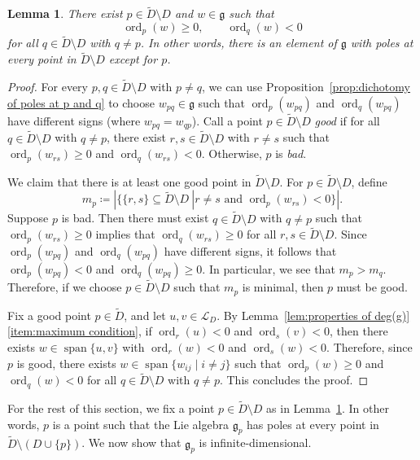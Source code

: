 \documentclass[12pt]{amsart}
\theoremstyle{plain}
\newtheorem{lemma}[theorem]{Lemma}
\theoremstyle{definition}
\numberwithin{equation}{section}
\def\g{\mathfrak{g}}
\def\L{\mathcal{L}}
\DeclareMathOperator{\spn}{span}
\DeclareMathOperator{\ord}{ord}
\begin{document}
\begin{lemma}\label{lem:good point}
    There exist $p \in \widetilde{D} \setminus D$ and $w \in \g$ such that
    $$\ord_p(w) \geq 0, \qquad \ord_q(w) < 0$$
    for all $q \in \widetilde{D} \setminus D$ with $q \neq p$. In other words, there is an element of $\g$ with poles at every point in $\widetilde{D} \setminus D$ except for $p$.
\end{lemma}
\begin{proof}
    For every $p,q \in \widetilde{D} \setminus D$ with $p \neq q$, we can use Proposition~\ref{prop:dichotomy of poles at p and q} to choose $w_{pq} \in \g$ such that $\ord_{p}(w_{pq})$ and $\ord_{q}(w_{pq})$ have different signs (where $w_{pq} = w_{qp}$). Call a point $p \in \widetilde{D} \setminus D$ \emph{good} if for all $q \in \widetilde{D} \setminus D$ with $q \neq p$, there exist $r,s \in \widetilde{D} \setminus D$ with $r \neq s$ such that $\ord_{p}(w_{rs}) \geq 0$ and $\ord_{q}(w_{rs}) < 0$. Otherwise, $p$ is \emph{bad}.

    We claim that there is at least one good point in $\widetilde{D} \setminus D$. For $p \in \widetilde{D} \setminus D$, define
    $$m_p \coloneqq \left.\left|\Big\{\{r,s\} \subseteq \widetilde{D} \setminus D \ \right| r \neq s \text{ and } \ord_p(w_{rs}) < 0\Big\}\right|.$$
    Suppose $p$ is bad. Then there must exist $q \in \widetilde{D} \setminus D$ with $q \neq p$ such that $\ord_{p}(w_{rs}) \geq 0$ implies that $\ord_{q}(w_{rs}) \geq 0$ for all $r,s \in \widetilde{D} \setminus D$. Since $\ord_{p}(w_{pq})$ and $\ord_{q}(w_{pq})$ have different signs, it follows that $\ord_{p}(w_{pq}) < 0$ and $\ord_{q}(w_{pq}) \geq 0$. In particular, we see that $m_p > m_q$. Therefore, if we choose $p \in \widetilde{D} \setminus D$ such that $m_p$ is minimal, then $p$ must be good.

    Fix a good point $p \in \widetilde{D}$, and let $u,v \in \L_D$. By Lemma~\ref{lem:properties of deg(g)}\eqref{item:maximum condition}, if $\ord_{r}(u) < 0$ and $\ord_{s}(v) < 0$, then there exists $w \in \spn\{u,v\}$ with $\ord_{r}(w) < 0$ and $\ord_{s}(w) < 0$. Therefore, since $p$ is good, there exists $w \in \spn\{w_{ij} \mid i \neq j\}$ such that $\ord_p(w) \geq 0$ and $\ord_{q}(w) < 0$ for all $q \in \widetilde{D} \setminus D$ with $q \neq p$. This concludes the proof.
\end{proof}

For the rest of this section, we fix a point $p \in \widetilde{D} \setminus D$ as in Lemma~\ref{lem:good point}. In other words, $p$ is a point such that the Lie algebra $\g_p$ has poles at every point in $\widetilde{D} \setminus (D \cup \{p\})$. We now show that $\g_p$ is infinite-dimensional.
\end{document}

